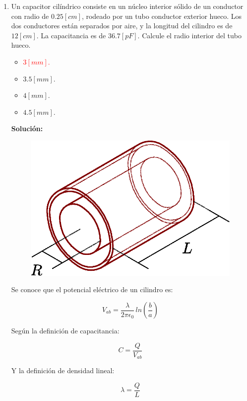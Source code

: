 \documentclass[letter,11pt]{article}
\begin{document}
\begin{enumerate}
\item Un capacitor cilíndrico consiste en un núcleo interior sólido de un
conductor con radio de $0.25 [cm]$, rodeado por un tubo conductor exterior
hueco. Los dos conductores están separados por aire, y la longitud del cilindro
es de $12 [cm]$. La capacitancia es de $36.7 [pF]$. Calcule el radio interior
del tubo hueco.

\begin{itemize}
    \item \textcolor{red}{$3 [mm]$.}
    \item $3.5 [mm]$.
    \item $4 [mm]$.
    \item $4.5 [mm]$.
\end{itemize}

\textbf{Solución:}

\begin{figure}[!h]
\centering
\includegraphics[scale=0.60]{resources/a9.eps}
\end{figure}

Se conoce que el potencial eléctrico de un cilindro es:

\begin{equation*}
    V_{ab} = \frac{\lambda}{2\pi\epsilon_0}\,ln\left(\frac{b}{a}\right)
\end{equation*}

Según la definición de capacitancia:

\begin{equation*}
    C = \frac{Q}{V_{ab}}
\end{equation*}

Y la definición de densidad lineal:

\begin{equation*}
    \lambda = \frac{Q}{L}
\end{equation*}


\end{enumerate}
\end{document}
